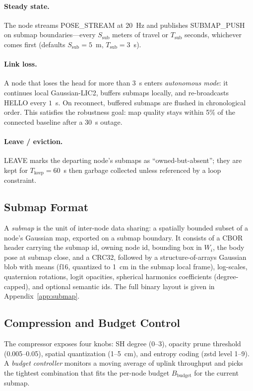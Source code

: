 \paragraph{Steady state.} The node streams POSE\_STREAM at 20~Hz and publishes
SUBMAP\_PUSH on submap boundaries---every $S_{\text{sub}}$ meters of travel or
$T_{\text{sub}}$ seconds, whichever comes first (defaults $S_{\text{sub}}=5$~m,
$T_{\text{sub}}=3$~s).

\paragraph{Link loss.} A node that loses the head for more than $3$~s enters
\emph{autonomous mode}: it continues local Gaussian-LIC2, buffers submaps
locally, and re-broadcasts HELLO every $1$~s. On reconnect, buffered submaps
are flushed in chronological order. This satisfies the robustness goal: map
quality stays within 5\% of the connected baseline after a 30~s outage.

\paragraph{Leave / eviction.} LEAVE marks the departing node's submaps as
``owned-but-absent''; they are kept for $T_{\text{keep}}=60$~s then garbage
collected unless referenced by a loop constraint.

\subsection{Submap Format}
\label{sec:submap-format}

A \emph{submap} is the unit of inter-node data sharing: a spatially bounded
subset of a node's Gaussian map, exported on a submap boundary. It consists of
a CBOR header carrying the submap id, owning node id, bounding box in $W_i$,
the body pose at submap close, and a CRC32, followed by a structure-of-arrays
Gaussian blob with means (f16, quantized to 1~cm in the submap local frame),
log-scales, quaternion rotations, logit opacities, spherical harmonics
coefficients (degree-capped), and optional semantic ids. The full binary
layout is given in Appendix~\ref{app:submap}.

\subsection{Compression and Budget Control}
\label{sec:compression}

The compressor exposes four knobs: SH degree (0--3), opacity prune threshold
(0.005--0.05), spatial quantization (1--5~cm), and entropy coding (zstd level
1--9). A \emph{budget controller} monitors a moving average of uplink
throughput and picks the tightest combination that fits the per-node budget
$B_{\text{budget}}$ for the current submap.

